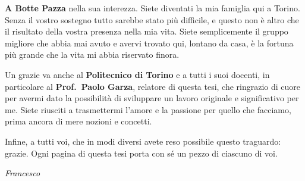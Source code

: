{\textbf{A Botte Pazza} nella sua interezza. Siete diventati la mia famiglia qui a Torino. Senza il vostro sostegno tutto sarebbe stato più difficile, e questo non è altro che il risultato della vostra presenza nella mia vita. Siete semplicemente il gruppo migliore che abbia mai avuto e avervi trovato qui, lontano da casa, è la fortuna più grande che la vita mi abbia riservato finora.

Un grazie va anche al \textbf{Politecnico di Torino} e a tutti i suoi docenti, in particolare al \textbf{Prof.~Paolo Garza}, relatore di questa tesi, che ringrazio di cuore per avermi dato la possibilità di sviluppare un lavoro originale e significativo per me. Siete riusciti a trasmettermi l'amore e la passione per quello che facciamo, prima ancora di mere nozioni e concetti.

\noindent\begin{minipage}{\linewidth}\setlength{\parskip}{0.9\baselineskip}
Infine, a tutti voi, che in modi diversi avete reso possibile questo traguardo: grazie. Ogni pagina di questa tesi porta con sé un pezzo di ciascuno di voi.\par\hfill\textit{Francesco}
\end{minipage}

\par}
